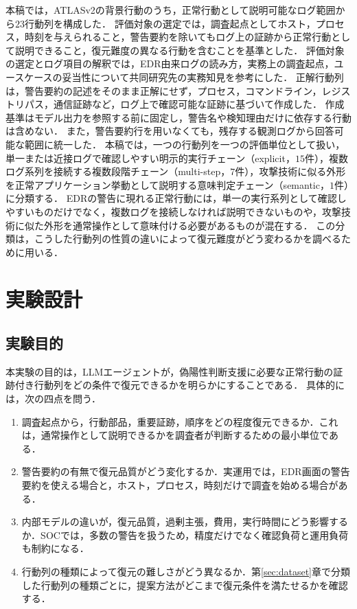 \documentclass[a4paper,twocolumn,10pt]{article}
\newcommand{\code}[1]{{\small\ttfamily #1}}
\begin{document}
本稿では，ATLASv2の背景行動のうち，正常行動として説明可能なログ範囲から\(23\)行動列を構成した．
評価対象の選定では，調査起点としてホスト，プロセス，時刻を与えられること，警告要約を除いてもログ上の証跡から正常行動として説明できること，復元難度の異なる行動を含むことを基準とした．
評価対象の選定とログ項目の解釈では，EDR由来ログの読み方，実務上の調査起点，ユースケースの妥当性について共同研究先の実務知見を参考にした．
正解行動列は，警告要約の記述をそのまま正解にせず，プロセス，コマンドライン，レジストリパス，通信証跡など，ログ上で確認可能な証跡に基づいて作成した．
作成基準はモデル出力を参照する前に固定し，警告名や検知理由だけに依存する行動は含めない．
また，警告要約行を用いなくても，残存する観測ログから回答可能な範囲に統一した．
本稿では，一つの行動列を一つの評価単位として扱い，単一または近接ログで確認しやすい明示的実行チェーン（\code{explicit}，\(15\)件），複数ログ系列を接続する複数段階チェーン（\code{multi-step}，\(7\)件），攻撃技術に似る外形を正常アプリケーション挙動として説明する意味判定チェーン（\code{semantic}，\(1\)件）に分類する．
EDRの警告に現れる正常行動には，単一の実行系列として確認しやすいものだけでなく，複数ログを接続しなければ説明できないものや，攻撃技術に似た外形を通常操作として意味付ける必要があるものが混在する．
この分類は，こうした行動列の性質の違いによって復元難度がどう変わるかを調べるために用いる．

\section{実験設計}
\label{sec:experiment}

\subsection{実験目的}

本実験の目的は，LLMエージェントが，偽陽性判断支援に必要な正常行動の証跡付き行動列をどの条件で復元できるかを明らかにすることである．
具体的には，次の四点を問う．
\begin{enumerate}
\setlength{\topsep}{2pt}
\setlength{\partopsep}{0pt}
\setlength{\itemsep}{0pt}
\setlength{\parsep}{0pt}
\item 調査起点から，行動部品，重要証跡，順序をどの程度復元できるか．これは，通常操作として説明できるかを調査者が判断するための最小単位である．
\item 警告要約の有無で復元品質がどう変化するか．実運用では，EDR画面の警告要約を使える場合と，ホスト，プロセス，時刻だけで調査を始める場合がある．
\item 内部モデルの違いが，復元品質，過剰主張，費用，実行時間にどう影響するか．SOCでは，多数の警告を扱うため，精度だけでなく確認負荷と運用負荷も制約になる．
\item 行動列の種類によって復元の難しさがどう異なるか．第\ref{sec:dataset}章で分類した行動列の種類ごとに，提案方法がどこまで復元条件を満たせるかを確認する．
\end{enumerate}
\end{document}
